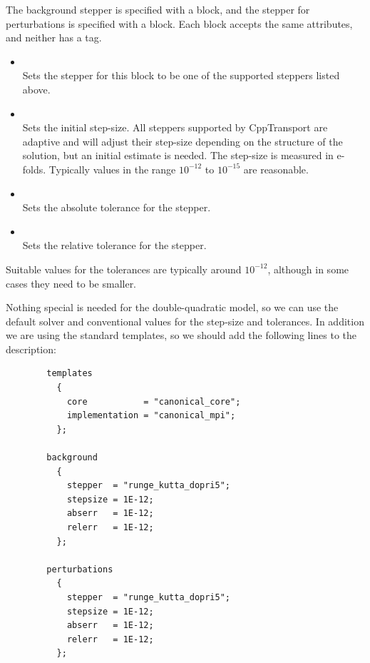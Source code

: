 \documentclass[11pt,a4paper]{article}
\renewcommand{\texttt}[1]{{\ttfamily\fontseries{l}\selectfont{#1}}}
\newenvironment{example}{\begin{tcolorbox}[enhanced,breakable,colback=black!10,colbacktitle=black!20,colframe=black!40,coltitle=black,title=Example,fonttitle=\sffamily\fontseries{b}\selectfont]}{\end{tcolorbox}}
\newcommand{\packagefont}{\sffamily}
\newcommand{\CppTransport}{{\packagefont CppTransport}}
\newcommand{\block}[1]{\texttt{#1}}
\newcommand{\attribute}[1]{\texttt{#1}}
\newcommand{\option}[1]{\texttt{\textbf{#1}}}
\begin{document}
The background stepper is specified with a \block{background}
block, and the stepper for perturbations is specified with
a \block{perturbations} block.
Each block accepts the same attributes, and neither has a tag.
\begin{itemize}
    \item \attribute{stepper = "string";} \\
    Sets the stepper for this block to be one of the supported
    steppers listed above.
    
    \item \attribute{stepsize = number;} \\
    Sets the initial step-size.
    All steppers supported by {\CppTransport} are adaptive
    and will adjust their step-size depending on the structure
    of the solution, but an initial estimate is needed.
    The step-size is measured in e-folds.
    Typically values in the range $10^{-12}$ to $10^{-15}$
    are reasonable.
    
    \item \attribute{abserr = number;} \\
    Sets the absolute tolerance for the stepper.
    
    \item \attribute{relerr = number;} \\
    Sets the relative tolerance for the stepper.    
\end{itemize}
Suitable values for the tolerances are typically around
$10^{-12}$, although in some cases they need to be smaller.

\begin{example}
    Nothing special is needed for the double-quadratic model,
    so we can use the default
    \option{runge\_kutta\_dopri5}
    solver and conventional values for the step-size and tolerances.
    In addition we are using the standard templates,
    so we should add the following lines to the description:
    \begin{verbatim}
        templates
          {
            core           = "canonical_core";
            implementation = "canonical_mpi"; 
          };
        
        background
          {
            stepper  = "runge_kutta_dopri5";
            stepsize = 1E-12;
            abserr   = 1E-12;
            relerr   = 1E-12;
          };
        
        perturbations
          {
            stepper  = "runge_kutta_dopri5";
            stepsize = 1E-12;
            abserr   = 1E-12;
            relerr   = 1E-12;
          };
    \end{verbatim}

\end{example}
\end{document}
